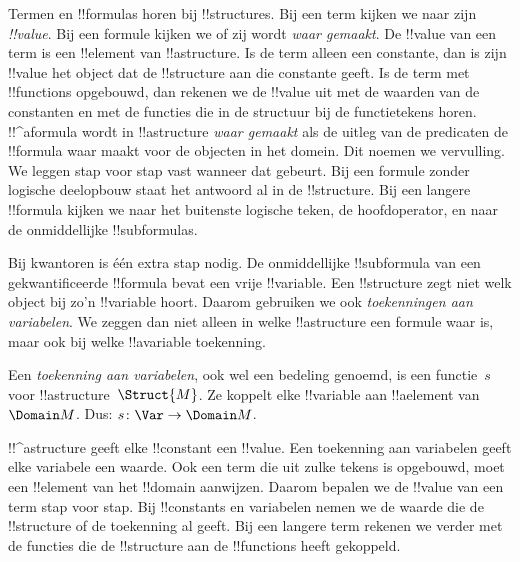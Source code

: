 \documentclass[../../../include/open-logic-section]{subfiles}
\begin{document}


\begin{explain}
Termen en !!{formula}s horen bij !!{structure}s. Bij een term kijken we
naar zijn \emph{!!{value}}. Bij een formule kijken we of zij wordt
\emph{waar gemaakt}. De !!{value} van een term is een !!{element} van
!!a{structure}. Is de term alleen een constante, dan is zijn !!{value}
het object dat de !!{structure} aan die constante geeft. Is de term met
!!{function}s opgebouwd, dan rekenen we de !!{value} uit met de waarden
van de constanten en met de functies die in de structuur bij de
functietekens horen. !!^a{formula} wordt in !!a{structure} \emph{waar
gemaakt} als de uitleg van de predicaten de !!{formula} waar maakt voor
de objecten in het domein. Dit noemen we vervulling. We leggen stap
voor stap vast wanneer dat gebeurt. Bij een formule zonder logische
deelopbouw staat het antwoord al in de !!{structure}. Bij een langere
!!{formula} kijken we naar het buitenste logische teken, de
hoofdoperator, en naar de onmiddellijke !!{subformula}s.

Bij kwantoren is één extra stap nodig. De onmiddellijke !!{subformula}
van een gekwantificeerde !!{formula} bevat een vrije !!{variable}.
Een !!{structure} zegt niet welk object bij zo'n !!{variable} hoort.
Daarom gebruiken we ook \emph{toekenningen aan variabelen}. We zeggen
dan niet alleen in welke !!a{structure} een formule waar is, maar ook
bij welke !!a{variable} toekenning.
\end{explain}

\begin{defn}
Een \emph{toekenning aan variabelen}, ook wel een bedeling genoemd,
is een functie~$s$ voor !!a{structure}~$\Struct{M}$. Ze koppelt elke
!!{variable} aan !!a{element} van~$\Domain M$. Dus:
$s\colon \Var \to \Domain M$.
\end{defn}

\begin{explain}
!!^a{structure} geeft elke !!{constant} een !!{value}. Een toekenning
aan variabelen geeft elke variabele een waarde. Ook een term die uit
zulke tekens is opgebouwd, moet een !!{element} van het !!{domain}
aanwijzen. Daarom bepalen we de !!{value} van een term stap voor stap.
Bij !!{constant}s en variabelen nemen we de waarde die de !!{structure}
of de toekenning al geeft. Bij een langere term rekenen we verder met
de functies die de !!{structure} aan de !!{function}s heeft gekoppeld.
\end{explain}
\end{document}
